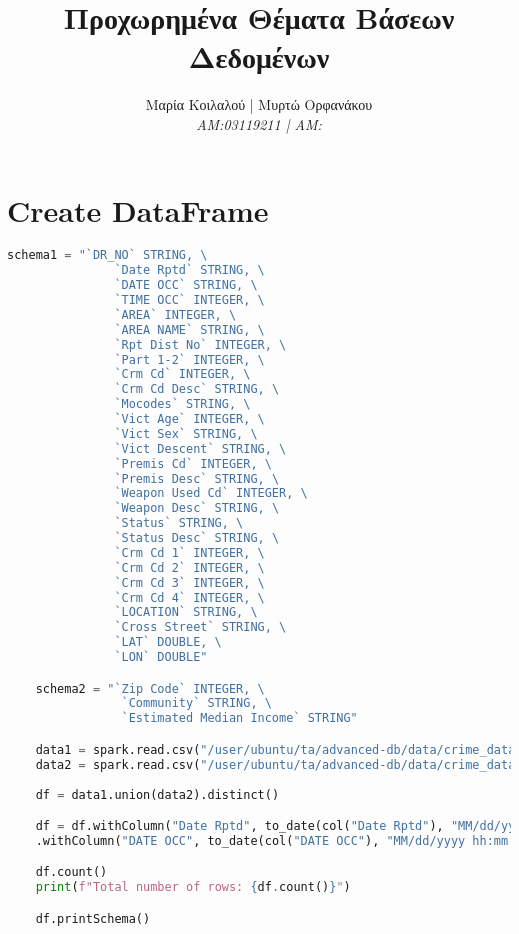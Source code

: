 \documentclass{article}
\title{Προχωρημένα Θέματα Βάσεων Δεδομένων}
\author{Μαρία Κοιλαλού | Μυρτώ Ορφανάκου\\
\textit{AM:03119211 | ΑM:}}
\begin{document}
\maketitle

\vspace{3\baselineskip}

\section{Create DataFrame}

\begin{lstlisting}[language = Python]
    schema1 = "`DR_NO` STRING, \
               `Date Rptd` STRING, \
               `DATE OCC` STRING, \
               `TIME OCC` INTEGER, \
               `AREA` INTEGER, \
               `AREA NAME` STRING, \
               `Rpt Dist No` INTEGER, \
               `Part 1-2` INTEGER, \
               `Crm Cd` INTEGER, \
               `Crm Cd Desc` STRING, \
               `Mocodes` STRING, \
               `Vict Age` INTEGER, \
               `Vict Sex` STRING, \
               `Vict Descent` STRING, \
               `Premis Cd` INTEGER, \
               `Premis Desc` STRING, \
               `Weapon Used Cd` INTEGER, \
               `Weapon Desc` STRING, \
               `Status` STRING, \
               `Status Desc` STRING, \
               `Crm Cd 1` INTEGER, \
               `Crm Cd 2` INTEGER, \
               `Crm Cd 3` INTEGER, \
               `Crm Cd 4` INTEGER, \
               `LOCATION` STRING, \
               `Cross Street` STRING, \
               `LAT` DOUBLE, \
               `LON` DOUBLE"

    schema2 = "`Zip Code` INTEGER, \
                `Community` STRING, \
                `Estimated Median Income` STRING"

    data1 = spark.read.csv("/user/ubuntu/ta/advanced-db/data/crime_data_2010.csv", header=True, schema=schema1)
    data2 = spark.read.csv("/user/ubuntu/ta/advanced-db/data/crime_data_2020.csv", header=True, schema=schema1)
    
    df = data1.union(data2).distinct()

    df = df.withColumn("Date Rptd", to_date(col("Date Rptd"), "MM/dd/yyyy hh:mm:ss a")) \
    .withColumn("DATE OCC", to_date(col("DATE OCC"), "MM/dd/yyyy hh:mm:ss a"))

    df.count()
    print(f"Total number of rows: {df.count()}")

    df.printSchema()
\end{lstlisting}
\end{document}
